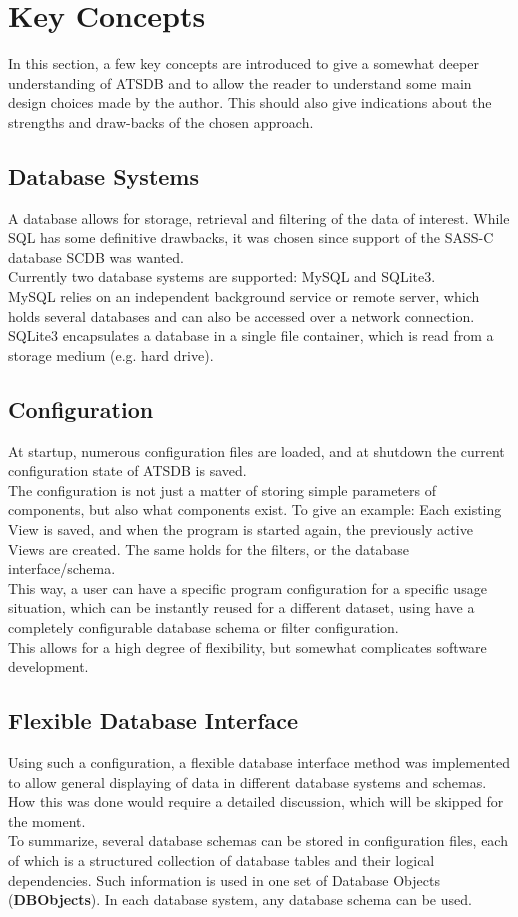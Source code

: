 \section{Key Concepts}
\label{sec:key_concepts}

In this section, a few key concepts are introduced to give a somewhat deeper understanding of ATSDB and to allow the reader to understand some main design choices made by the author. This should also give indications about the strengths and draw-backs of the chosen approach.

\subsection*{Database Systems}
A database allows for storage, retrieval and filtering of the data of interest. While SQL has some definitive drawbacks, it was chosen since support of the SASS-C database SCDB was wanted.\\
Currently  two  database  systems  are  supported: MySQL and SQLite3. \\
MySQL  relies on an independent background service or remote server, which holds several databases and can also be accessed over a network connection.\\
SQLite3 encapsulates a database in a single file container, which is read from a storage medium (e.g. hard drive).

\subsection*{Configuration}
At startup, numerous configuration files are loaded, and at shutdown the current configuration state of ATSDB is saved.\\
The configuration is not just a matter of storing simple parameters of components, but also what components exist. To give an example: Each existing View is saved, and when the program is started again, the previously active Views are created.  The same holds for the filters, or the database interface/schema. \\
This way, a user can have a specific program configuration for a specific usage situation, which can be instantly reused for a different dataset, using have a completely configurable database schema or filter configuration. \\
This allows for a high degree of flexibility, but somewhat complicates software development.

\subsection*{Flexible Database Interface}
Using such a configuration, a flexible database interface method was implemented to allow general displaying of data in different database systems and schemas.  How this was done would require a detailed discussion, which will be skipped for the moment.\\
To summarize, several database schemas can be stored in configuration files, each of which is a structured collection of database tables and their logical dependencies. Such information is used in one set of Database Objects (\textbf{DBObjects}). In each database system, any database schema can be used.

